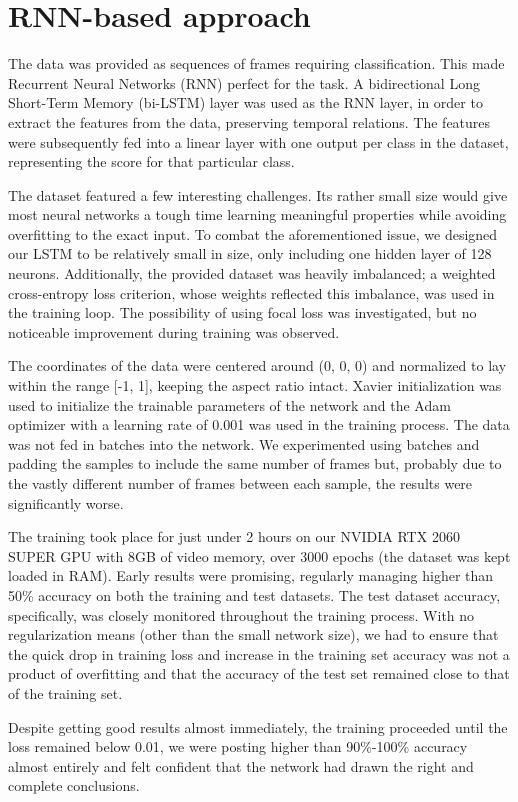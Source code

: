 \documentclass[times,twocolumn,final]{elsarticle}
\begin{document}

\linenumbers

\section{RNN-based approach}
The data was provided as sequences of frames requiring classification. This made Recurrent Neural Networks (RNN) perfect for the task. A bidirectional Long Short-Term Memory (bi-LSTM) layer was used as the RNN layer, in order to extract the features from the data, preserving temporal relations. The features were subsequently fed into a linear layer with one output per class in the dataset, representing the score for that particular class.

The dataset featured a few interesting challenges. Its rather small size would give most neural networks a tough time learning meaningful properties while avoiding overfitting to the exact input. To combat the aforementioned issue, we designed our LSTM to be relatively small in size, only including one hidden layer of 128 neurons. Additionally, the provided dataset was heavily imbalanced; a weighted cross-entropy loss criterion, whose weights reflected this imbalance, was used in the training loop. The possibility of using focal loss \cite{lin2017focal} was investigated, but no noticeable improvement during training was observed. 

The coordinates of the data were centered around (0, 0, 0) and normalized to lay within the range [-1, 1], keeping the aspect ratio intact. Xavier initialization \cite{glorot2010understanding} was used to initialize the trainable parameters of the network and the Adam optimizer with a learning rate of 0.001 was used in the training process. The data was not fed in batches into the network. We experimented using batches and padding the samples to include the same number of frames but, probably due to the vastly different number of frames between each sample, the results were significantly worse.

The training took place for just under 2 hours on our NVIDIA RTX\texttrademark{} 2060 SUPER GPU with 8GB of video memory, over 3000 epochs (the dataset was kept loaded in RAM). Early results were promising, regularly managing higher than 50\% accuracy on both the training and test datasets. The test dataset accuracy, specifically, was closely monitored throughout the training process. With no regularization means (other than the small network size), we had to ensure that the quick drop in training loss and increase in the training set accuracy was not a product of overfitting and that the accuracy of the test set remained close to that of the training set.

Despite getting good results almost immediately, the training proceeded until the loss remained below 0.01, we were posting higher than 90\%-100\% accuracy almost entirely and felt confident that the network had drawn the right and complete conclusions.




\end{document}
